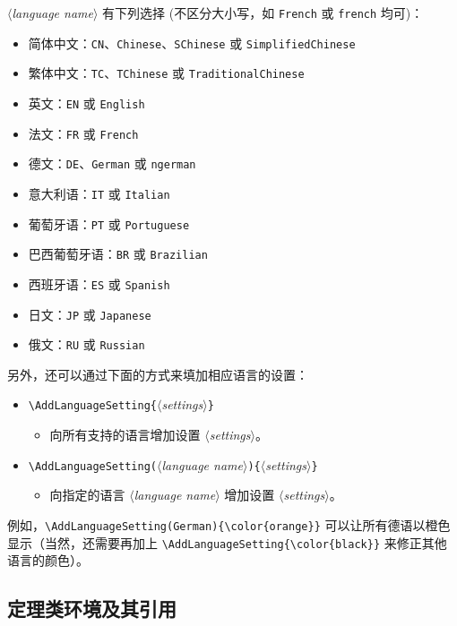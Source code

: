 \documentclass[puretext]{einfart}
\providecommand{\meta}[1]{$\langle${\normalfont\itshape#1}$\rangle$}
\begin{document}
\meta{language name} 有下列选择 (不区分大小写，如 \texttt{French} 或 \texttt{french} 均可)：
\begin{itemize}
    \item 简体中文：\texttt{CN}、\texttt{Chinese}、\texttt{SChinese} 或 \texttt{SimplifiedChinese}
    \item 繁体中文：\texttt{TC}、\texttt{TChinese} 或 \texttt{TraditionalChinese}
    \item 英文：\texttt{EN} 或 \texttt{English}
    \item 法文：\texttt{FR} 或 \texttt{French}
    \item 德文：\texttt{DE}、\texttt{German} 或 \texttt{ngerman}
    \item 意大利语：\texttt{IT} 或 \texttt{Italian}
    \item 葡萄牙语：\texttt{PT} 或 \texttt{Portuguese}
    \item 巴西葡萄牙语：\texttt{BR} 或 \texttt{Brazilian}
    \item 西班牙语：\texttt{ES} 或 \texttt{Spanish}
    \item 日文：\texttt{JP} 或 \texttt{Japanese}
    \item 俄文：\texttt{RU} 或 \texttt{Russian}
\end{itemize}

另外，还可以通过下面的方式来填加相应语言的设置：
\begin{itemize}
    \item \lstinline|\AddLanguageSetting{|\meta{settings}\lstinline|}|
    \begin{itemize}
        \item 向所有支持的语言增加设置 \meta{settings}。
    \end{itemize}
    \item \lstinline|\AddLanguageSetting(|\meta{language name}\lstinline|){|\meta{settings}\lstinline|}|
    \begin{itemize}
        \item 向指定的语言 \meta{language name} 增加设置 \meta{settings}。
    \end{itemize}
\end{itemize}
例如，\lstinline|\AddLanguageSetting(German){\color{orange}}| 可以让所有德语以橙色显示（当然，还需要再加上 \lstinline|\AddLanguageSetting{\color{black}}| 来修正其他语言的颜色）。


\subsection{定理类环境及其引用}
\end{document}
